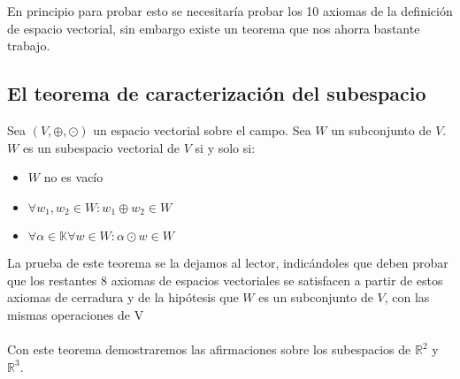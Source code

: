 En principio para probar esto se necesitaría probar los 10 axiomas de la definición de espacio vectorial, sin embargo existe un teorema que nos ahorra bastante trabajo.


\newpage
\subsection{El teorema de caracterización del subespacio}

\begin{theorem}
Sea $\left(V, \oplus, \odot\right)$ un espacio vectorial sobre el campo. Sea $W$ un subconjunto de $V$. $W$ es un subespacio vectorial de $V$ si y solo si:
	
	\begin{itemize}
	\item $W$ no es vac\'io
	\item $\forall w_1, w_2 \in W: w_1\oplus w_2 \in W$
	\item $\forall \alpha \in \mathbb{K} \forall w \in W: \alpha \odot w \in W$
	
	\end{itemize}

\end{theorem}

La prueba de este teorema se la dejamos al lector, indic\'andoles que deben probar que los restantes 8 axiomas de espacios vectoriales se satisfacen a partir de estos axiomas de cerradura y de la hip\'otesis que $W$ es un subconjunto de $V$, con las mismas operaciones de V
\\
\\
Con este teorema demostraremos las afirmaciones sobre los subespacios de $\mathbb{R}^2$ y 
$\mathbb{R}^3$.

